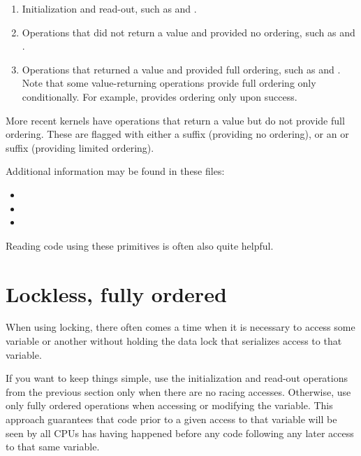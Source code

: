 \begin{enumerate}
  \item Initialization and read-out, such as  and .

  \item Operations that did not return a value and provided no ordering,
	such as  and .

  \item Operations that returned a value and provided full ordering, such as
	 and .
	Note that some value-returning operations provide full ordering
	only conditionally.
	For example,  provides ordering only upon success.
\end{enumerate}

More recent kernels have operations that return a value but do not
provide full ordering.  These are flagged with either a 
suffix (providing no ordering), or an  or  suffix
(providing limited ordering).

Additional information may be found in these files:

\begin{itemize}
  \item {}
  \item {}
  \item {}
\end{itemize}

Reading code using these primitives is often also quite helpful.


\section{Lockless, fully ordered}

When using locking, there often comes a time when it is necessary
to access some variable or another without holding the data lock
that serializes access to that variable.

If you want to keep things simple, use the initialization and read-out
operations from the previous section only when there are no racing
accesses.
Otherwise, use only fully ordered operations when accessing or
modifying the variable.
This approach guarantees that code prior to a given access to that
variable will be seen by all CPUs has having happened before any code
following any later access to that same variable.

